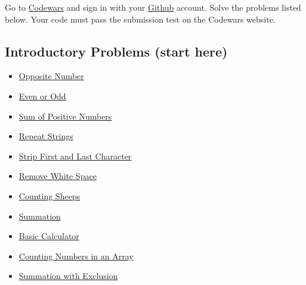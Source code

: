 \documentclass[12pt, a4paper]{article}
\begin{document}
Go to \href{https://www.codewars.com/users/sign\_in}{Codewars} and sign in with your \href{https://github.com}{Github} account.
Solve the problems listed below.
Your code must pass the submission test on the Codewars website.
\subsection{Introductory Problems (start here)}
\label{sec:org7de2e2b}
\begin{itemize}
\item \href{https://www.codewars.com/kata/56dec885c54a926dcd001095}{Opposite Number}
\item \href{https://www.codewars.com/kata/53da3dbb4a5168369a0000fe}{Even or Odd}
\item \href{https://www.codewars.com/kata/5715eaedb436cf5606000381}{Sum of Positive Numbers}
\item \href{https://www.codewars.com/kata/57a0e5c372292dd76d000d7e}{Repeat Strings}
\item \href{https://www.codewars.com/kata/56bc28ad5bdaeb48760009b0}{Strip First and Last Character}
\item \href{https://www.codewars.com/kata/remove-string-spaces/python}{Remove White Space}
\item \href{https://www.codewars.com/kata/54edbc7200b811e956000556}{Counting Sheeps}
\item \href{https://www.codewars.com/kata/55d24f55d7dd296eb9000030}{Summation}
\item \href{https://www.codewars.com/kata/57356c55867b9b7a60000bd7}{Basic Calculator}
\item \href{https://www.codewars.com/kata/576bb71bbbcf0951d5000044}{Counting Numbers in an Array}
\item \href{https://www.codewars.com/kata/576b93db1129fcf2200001e6}{Summation with Exclusion}
\end{itemize}
\end{document}
